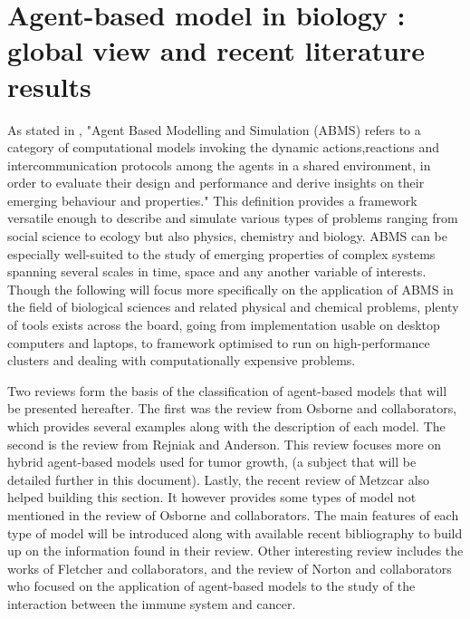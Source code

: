 \documentclass[11pt,a4paper]{article}
\begin{document}
\section{Agent-based model in biology : global view and recent literature results}
As stated in \cite{ABAR201713}, "Agent Based Modelling and Simulation (ABMS) refers to a category of computational models invoking the dynamic actions,reactions and intercommunication protocols among the agents in a shared environment, in order to evaluate their design and performance and derive insights on their emerging behaviour and properties." This definition provides a framework versatile enough to describe and simulate various types of problems ranging from social science to ecology but also physics, chemistry and biology. ABMS can be especially well-suited to the study of emerging properties of complex systems spanning several scales in time, space and any another variable of interests. Though the following will focus more specifically on the application of ABMS in the field of biological sciences and related physical and chemical problems, plenty of tools exists across the board, going from implementation usable on desktop computers and laptops, to framework optimised to run on high-performance clusters and dealing with computationally expensive problems. 

Two reviews form the basis of the classification of agent-based models that will be presented hereafter. The first was the review from Osborne and collaborators, which provides several examples along with the description of each model.\cite{Osborne2017} The second is the review from Rejniak and Anderson.\cite{Rejniak2011} This review focuses more on hybrid agent-based models used for tumor growth, (a subject that will be detailed further in this document). Lastly, the recent review of Metzcar also helped building this section.\cite{Metzcar2019} It however provides some types of model not mentioned in the review of Osborne and collaborators. The main features of each type of model will be introduced along with available recent bibliography to build up on the information found in their review. Other interesting review includes the works of Fletcher and collaborators,\cite{Fletcher2017} and the review of Norton and collaborators who focused on the application of agent-based models to the study of the interaction between the immune system and cancer.\cite{Norton2019}
\end{document}
